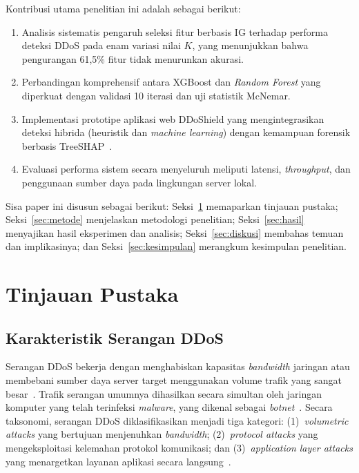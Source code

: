 \documentclass[conference,a4paper]{IEEEtran}
\begin{document}
Kontribusi utama penelitian ini adalah sebagai berikut:
\begin{enumerate}
  \item Analisis sistematis pengaruh seleksi fitur berbasis IG terhadap performa deteksi DDoS pada enam variasi nilai $K$, yang menunjukkan bahwa pengurangan 61,5\% fitur tidak menurunkan akurasi.
  \item Perbandingan komprehensif antara XGBoost dan \textit{Random Forest} yang diperkuat dengan validasi 10 iterasi dan uji statistik McNemar.
  \item Implementasi prototipe aplikasi web DDoShield yang mengintegrasikan deteksi hibrida (heuristik dan \textit{machine learning}) dengan kemampuan forensik berbasis TreeSHAP~\cite{ref_interp}.
  \item Evaluasi performa sistem secara menyeluruh meliputi latensi, \textit{throughput}, dan penggunaan sumber daya pada lingkungan server lokal.
\end{enumerate}

Sisa paper ini disusun sebagai berikut: Seksi~\ref{sec:tinjpus} memaparkan tinjauan pustaka;
Seksi~\ref{sec:metode} menjelaskan metodologi penelitian; Seksi~\ref{sec:hasil} menyajikan hasil
eksperimen dan analisis; Seksi~\ref{sec:diskusi} membahas temuan dan implikasinya; dan Seksi~\ref{sec:kesimpulan}
merangkum kesimpulan penelitian.

\section{Tinjauan Pustaka}
\label{sec:tinjpus}

\subsection{Karakteristik Serangan DDoS}

Serangan DDoS bekerja dengan menghabiskan kapasitas \textit{bandwidth} jaringan atau membebani
sumber daya server target menggunakan volume trafik yang sangat besar~\cite{ref_chandola2009}. Trafik
serangan umumnya dihasilkan secara simultan oleh jaringan komputer yang telah terinfeksi \textit{malware},
yang dikenal sebagai \textit{botnet}~\cite{ref_ring2019}. Secara taksonomi, serangan DDoS diklasifikasikan
menjadi tiga kategori: (1)~\textit{volumetric attacks} yang bertujuan menjenuhkan \textit{bandwidth};
(2)~\textit{protocol attacks} yang mengeksploitasi kelemahan protokol komunikasi; dan
(3)~\textit{application layer attacks} yang menargetkan layanan aplikasi secara langsung~\cite{ref_sahoo2020}.
\end{document}
